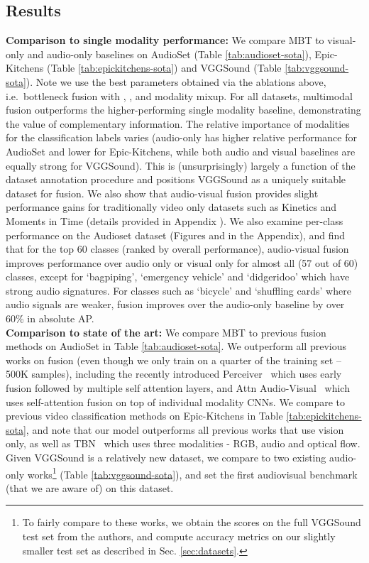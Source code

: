 \subsection{Results} \label{sec:sota}
\noindent\textbf{Comparison to single modality performance:}
We compare MBT to visual-only and audio-only baselines on AudioSet (Table \ref{tab:audioset-sota}), Epic-Kitchens (Table \ref{tab:epickitchens-sota}) and VGGSound (Table \ref{tab:vggsound-sota}). Note we use the best parameters obtained via the ablations above, i.e.\ bottleneck fusion with , ,  and modality mixup. For all datasets, multimodal fusion outperforms the higher-performing single modality baseline, demonstrating the value of complementary information. The relative importance of modalities for the classification labels varies (audio-only has higher relative performance for AudioSet and lower for Epic-Kitchens, while both audio and visual baselines are equally strong for VGGSound). This is (unsurprisingly) largely a function of the dataset annotation procedure and positions VGGSound as a uniquely suitable dataset for fusion. We also show that audio-visual fusion provides slight performance gains for traditionally video only datasets such as Kinetics and Moments in Time (details provided in Appendix \if{} \else{\ref{sec:additional-data}}
\fi). 
We also examine per-class performance on the Audioset dataset (Figures
\if{} \else{\ref{fig:per-class}}
\fi
and 
\if{} \else{\ref{fig:per-class-diff}}
\fi
in the Appendix), and find that for the top 60 classes (ranked by overall performance), audio-visual fusion improves performance over audio only or visual only for almost all (57 out of 60) classes, except for `bagpiping', `emergency vehicle' and `didgeridoo' which have strong audio signatures. For classes such as `bicycle' and `shuffling cards' where audio signals are weaker, fusion improves over the audio-only baseline by over 60\% in absolute AP. \\
\noindent\textbf{Comparison to state of the art:} 
We compare MBT to previous fusion methods on AudioSet in Table \ref{tab:audioset-sota}. We outperform all previous works on fusion (even though we only train on a quarter of the training set -- 500K samples), including the recently introduced Perceiver~\cite{jaegle2021perceiver} which uses early fusion followed by multiple self attention layers, and Attn Audio-Visual~\cite{fayek2020large} which uses self-attention fusion on top of individual modality CNNs. We compare to previous video classification methods on Epic-Kitchens in Table \ref{tab:epickitchens-sota}, and note that our model outperforms all previous works that use vision only, as well as TBN~\cite{kazakos2019epic} which uses three modalities - RGB, audio and optical flow. Given VGGSound is a relatively new dataset, we compare to two existing audio-only works\footnote{To fairly compare to these works, we obtain the scores on the full VGGSound test set from the authors, and compute accuracy metrics on our slightly smaller test set as described in Sec. \ref{sec:datasets}.} (Table \ref{tab:vggsound-sota}), and set the first audiovisual benchmark (that we are aware of) on this dataset. \\

